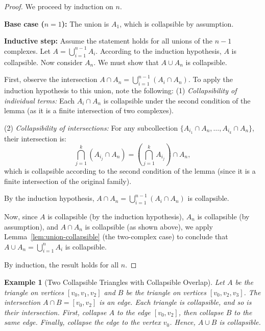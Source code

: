 \documentclass[12pt,a4paper,twoside, reqno, tbtags]{article}
\numberwithin{equation}{section}
\newtheorem{example}{Example}[section]
\begin{document}
\begin{proof}
We proceed by induction on \( n \).

\textbf{Base case (\( n = 1 \)):}  
The union is \( A_1 \), which is collapsible by assumption.

\textbf{Inductive step:}  
Assume the statement holds for all unions of the \( n-1 \) complexes. Let \( A = \bigcup_{i=1}^{n-1} A_i \). According to the induction hypothesis, \( A \) is collapsible. Now consider \( A_n \). We must show that \( A \cup A_n \) is collapsible.

First, observe the intersection \( A \cap A_n = \bigcup_{i=1}^{n-1} (A_i \cap A_n) \). To apply the induction hypothesis to this union, note the following:
(1) \emph{Collapsibility of individual terms:} Each \( A_i \cap A_n \) is collapsible under the second condition of the lemma (as it is a finite intersection of two complexes).

(2) \emph{Collapsibility of intersections:} For any subcollection \( \{A_{i_1} \cap A_n, \dots, A_{i_k} \cap A_n\} \), their intersection is:
\[
\bigcap_{j=1}^k (A_{i_j} \cap A_n) = \left(\bigcap_{j=1}^k A_{i_j}\right) \cap A_n,
\]
which is collapsible according to the second condition of the lemma (since it is a finite intersection of the original family).

By the induction hypothesis, \( A \cap A_n = \bigcup_{i=1}^{n-1} (A_i \cap A_n) \) is collapsible.

Now, since \( A \) is collapsible (by the induction hypothesis), \( A_n \) is collapsible (by assumption), and \( A \cap A_n \) is collapsible (as shown above), we apply Lemma~\ref{lem:union-collapsible} (the two-complex case) to conclude that \( A \cup A_n = \bigcup_{i=1}^n A_i \) is collapsible. 

By induction, the result holds for all \( n \).

\end{proof}

\begin{example}[Two Collapsible Triangles with Collapsible Overlap]
Let \( A \) be the triangle on vertices \( [v_0, v_1, v_2] \) and \( B \) be the triangle on vertices \( [v_0, v_2, v_3] \). The intersection \( A \cap B = [v_0, v_2] \) is an edge. Each triangle is collapsible, and so is their intersection. First, collapse \( A \) to the edge \( [v_0, v_2] \), then collapse \( B \) to the same edge. Finally, collapse the edge to the vertex \( v_0 \). Hence, \( A \cup B \) is collapsible.
\end{example}
\end{document}
